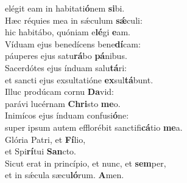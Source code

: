 \evenverse elégit eam in habitati\textbf{ó}nem \textbf{si}bi.\\
\oddverse Hæc réquies mea in sǽculum \textbf{sǽ}culi:~\*\\
\oddverse hic habitábo, quóniam e\textbf{lé}gi \textbf{e}am.\\
\evenverse Víduam ejus benedícens bene\textbf{dí}cam:~\*\\
\evenverse páuperes ejus satu\textbf{rá}bo \textbf{pá}nibus.\\
\oddverse Sacerdótes ejus índuam salu\textbf{tá}ri:~\*\\
\oddverse et sancti ejus exsultatióne \textbf{ex}sul\textbf{tá}bunt.\\
\evenverse Illuc prodúcam cornu \textbf{Da}vid:~\*\\
\evenverse parávi lucérnam \textbf{Chri}sto \textbf{me}o.\\
\oddverse Inimícos ejus índuam confusi\textbf{ó}ne:~\*\\
\oddverse super ipsum autem efflorébit sanctifi\textbf{cá}tio \textbf{me}a.\\
\evenverse Glória Patri, et \textbf{Fí}lio,~\*\\
\evenverse et Spi\textbf{rí}tui \textbf{San}cto.\\
\oddverse Sicut erat in princípio, et nunc, et \textbf{sem}per,~\*\\
\oddverse et in sǽcula sæcu\textbf{ló}rum. \textbf{A}men.\\

